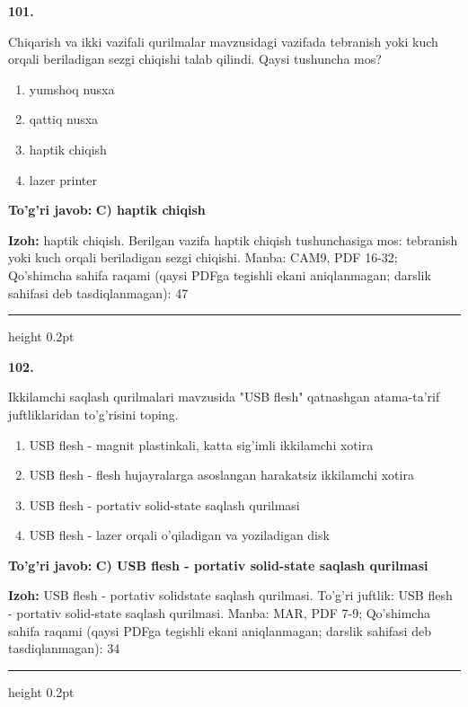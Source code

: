 \documentclass[10pt,a4paper]{article}
\begin{document}
{\bfseries\sffamily\color{ink} 101.}
\par
Chiqarish va ikki vazifali qurilmalar mavzusidagi vazifada tebranish yoki kuch orqali beriladigan sezgi chiqishi talab qilindi. Qaysi tushuncha mos?
\begin{enumerate}[label=\Alph*),leftmargin=9mm]
\item yumshoq nusxa
\item qattiq nusxa
\item haptik chiqish
\item lazer printer
\end{enumerate}
\begin{tcolorbox}[enhanced,breakable,colback=teal!4,colframe=teal!60!black,boxrule=0.45pt,arc=1.2mm,left=2.7mm,right=2.7mm,top=1.8mm,bottom=1.8mm,before skip=2mm,after skip=2mm]
{\bfseries\sffamily\color{teal}To'g'ri javob:} \textbf{C) haptik chiqish}
\par\smallskip
{\bfseries Izoh:} haptik chiqish. Berilgan vazifa haptik chiqish tushunchasiga mos: tebranish yoki kuch orqali beriladigan sezgi chiqishi. Manba: CAM9, PDF 16-32; Qo'shimcha sahifa raqami (qaysi PDFga tegishli ekani aniqlanmagan; darslik sahifasi deb tasdiqlanmagan): 47
\end{tcolorbox}
\vspace{2mm}\hrule height 0.2pt\vspace{3mm}

{\bfseries\sffamily\color{ink} 102.}
\par
Ikkilamchi saqlash qurilmalari mavzusida "USB flesh" qatnashgan atama-ta'rif juftliklaridan to'g'risini toping.
\begin{enumerate}[label=\Alph*),leftmargin=9mm]
\item USB flesh - magnit plastinkali, katta sig'imli ikkilamchi xotira
\item USB flesh - flesh hujayralarga asoslangan harakatsiz ikkilamchi xotira
\item USB flesh - portativ solid-state saqlash qurilmasi
\item USB flesh - lazer orqali o'qiladigan va yoziladigan disk
\end{enumerate}
\begin{tcolorbox}[enhanced,breakable,colback=teal!4,colframe=teal!60!black,boxrule=0.45pt,arc=1.2mm,left=2.7mm,right=2.7mm,top=1.8mm,bottom=1.8mm,before skip=2mm,after skip=2mm]
{\bfseries\sffamily\color{teal}To'g'ri javob:} \textbf{C) USB flesh - portativ solid-state saqlash qurilmasi}
\par\smallskip
{\bfseries Izoh:} USB flesh - portativ solidstate saqlash qurilmasi. To'g'ri juftlik: USB flesh - portativ solid-state saqlash qurilmasi. Manba: MAR, PDF 7-9; Qo'shimcha sahifa raqami (qaysi PDFga tegishli ekani aniqlanmagan; darslik sahifasi deb tasdiqlanmagan): 34
\end{tcolorbox}
\vspace{2mm}\hrule height 0.2pt\vspace{3mm}
\end{document}
